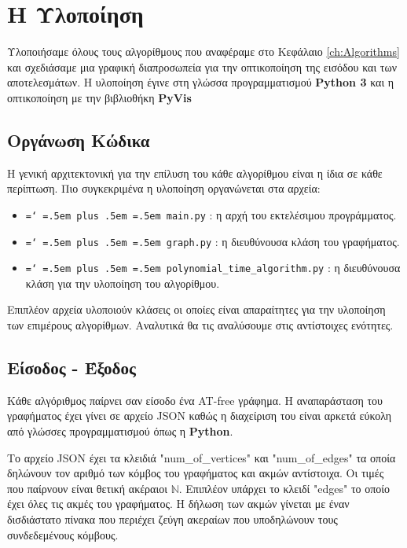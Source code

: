 \chapter{Η Υλοποίηση}
\label{ch:Implementation}

\newcommand{\myTTT}[1]{\texttt{\hyphenchar \font=`\- \spaceskip=.5em plus .5em \xspaceskip=.5em #1}}

Υλοποιήσαμε όλους τους αλγορίθμους που αναφέραμε στο Κεφάλαιο \ref{ch:Algorithms} και σχεδιάσαμε μια γραφική διαπροσωπεία για την οπτικοποίηση της εισόδου και των
αποτελεσμάτων. Η υλοποίηση έγινε στη γλώσσα προγραμματισμού \textbf{Python 3} και η οπτικοποίηση με την βιβλιοθήκη \textbf{PyVis}\cite{pyvis-docs}

\section{Οργάνωση Κώδικα}

Η γενική αρχιτεκτονική για την επίλυση του κάθε αλγορίθμου είναι η ίδια σε κάθε περίπτωση. Πιο συγκεκριμένα η υλοποίηση οργανώνεται στα αρχεία: 
\begin{itemize}
	\item \myTTT{main.py} : η αρχή του εκτελέσιμου προγράμματος.
	
	\item \myTTT{graph.py} : η διευθύνουσα κλάση του γραφήματος.
	
	\item \myTTT{polynomial\_time\_algorithm.py} : η διευθύνουσα κλάση για την υλοποίηση του αλγορίθμου.
	 
\end{itemize} 

Επιπλέον αρχεία υλοποιούν κλάσεις οι οποίες είναι απαραίτητες για την υλοποίηση των επιμέρους αλγορίθμων. Αναλυτικά θα τις αναλύσουμε στις αντίστοιχες ενότητες. 

\section{Είσοδος - Έξοδος}

Κάθε αλγόριθμος παίρνει σαν είσοδο ένα AT-free γράφημα. Η αναπαράσταση του γραφήματος έχει γίνει σε αρχείο JSON καθώς η διαχείριση του είναι αρκετά εύκολη από γλώσσες προγραμματισμού όπως η \textbf{Python}. 

Το αρχείο JSON έχει τα κλειδιά "num\_of\_vertices" και "num\_of\_edges" τα οποία δηλώνουν τον αριθμό των κόμβος του γραφήματος και ακμών αντίστοιχα. Οι τιμές που παίρνουν είναι θετική ακέραιοι $\mathbb{N}$. Επιπλέον υπάρχει το κλειδί "edges" το οποίο έχει όλες τις ακμές του γραφήματος. Η δήλωση των ακμών γίνεται με έναν δισδιάστατο πίνακα που περιέχει ζεύγη ακεραίων που υποδηλώνουν τους συνδεδεμένους κόμβους.

